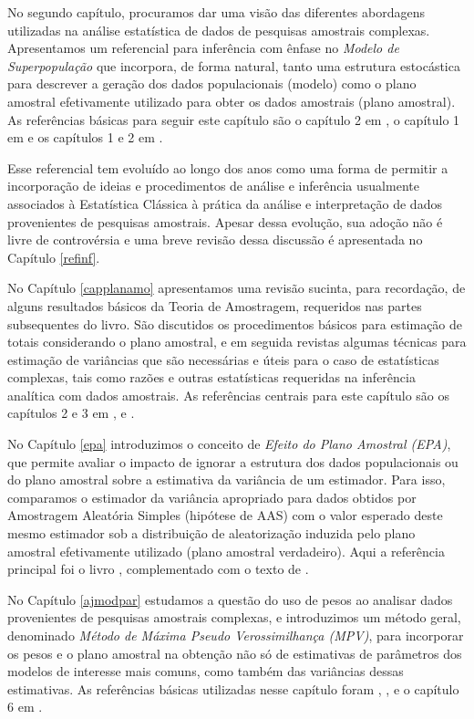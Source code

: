 \documentclass[
]{book}
\begin{document}
No segundo capítulo, procuramos dar uma visão das diferentes
abordagens utilizadas na análise estatística de dados de pesquisas
amostrais complexas. Apresentamos um referencial para inferência com
ênfase no \emph{Modelo de Superpopulação} que incorpora, de forma natural,
tanto uma estrutura estocástica para descrever a geração
dos dados populacionais (modelo) como o plano amostral
efetivamente utilizado para obter os dados amostrais (plano
amostral). As referências básicas para seguir este capítulo
são o capítulo 2 em \citep{Silva}, o capítulo 1 em \citep{SHS89} e os capítulos
1 e 2 em \citep{CHSK2003}.

Esse referencial tem evoluído ao longo dos anos como uma forma de
permitir a incorporação de ideias e procedimentos de análise
e inferência usualmente associados à Estatística Clássica
à prática da análise e interpretação de dados provenientes de
pesquisas amostrais. Apesar dessa evolução, sua adoção
não é livre de controvérsia e uma breve revisão dessa
discussão é apresentada no Capítulo \ref{refinf}.

No Capítulo \ref{capplanamo} apresentamos uma revisão sucinta, para
recordação, de alguns resultados básicos da Teoria de
Amostragem, requeridos nas partes subsequentes do livro. São
discutidos os procedimentos básicos para estimação de totais
considerando o plano amostral, e em seguida revistas algumas técnicas
para estimação de variâncias que são necessárias e úteis para o caso de
estatísticas complexas, tais como razões e outras estatísticas
requeridas na inferência analítica com dados amostrais. As
referências centrais para este capítulo são os capítulos 2 e 3
em \citep{SSW92}, \citep{W85} e \citep{cochran}.

No Capítulo \ref{epa} introduzimos o conceito de \emph{Efeito do Plano Amostral
(EPA)}, que permite avaliar o impacto de ignorar a estrutura dos
dados populacionais ou do plano amostral sobre a estimativa da variância
de um estimador. Para isso, comparamos o estimador da variância
apropriado para dados obtidos por Amostragem Aleatória Simples
(hipótese de AAS) com o valor esperado deste mesmo estimador sob a
distribuição de aleatorização induzida pelo plano amostral efetivamente utilizado
(plano amostral verdadeiro). Aqui a referência principal foi o livro
\citep{SHS89}, complementado com o texto de \citep{lethonen}.

No Capítulo \ref{ajmodpar} estudamos a questão do uso de pesos ao analisar dados
provenientes de pesquisas amostrais complexas, e introduzimos um método geral,
denominado \emph{Método de Máxima Pseudo Verossimilhança (MPV)}, para incorporar os pesos
e o plano amostral na obtenção não só de estimativas de parâmetros dos modelos
de interesse mais comuns, como também das variâncias dessas estimativas. As
referências básicas utilizadas nesse capítulo foram
\citep{SHS89}, \citep{Pfeff}, \citep{binder83} e o capítulo 6 em \citep{Silva}.
\end{document}
